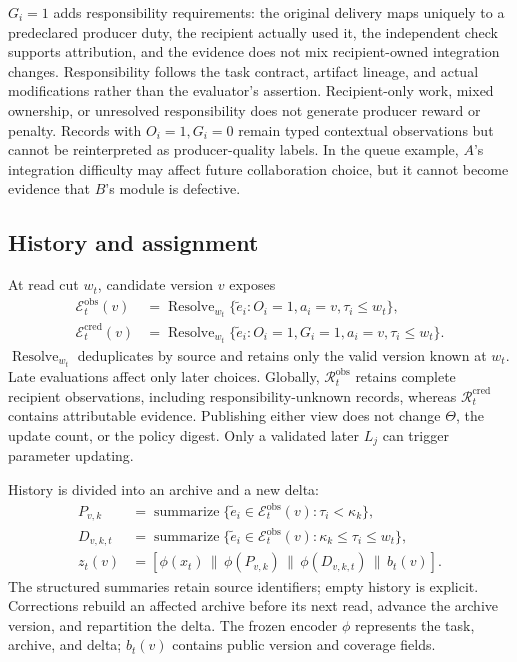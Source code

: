\documentclass[sigconf,anonymous]{aamas}
\begin{document}
$G_i=1$ adds responsibility requirements: the original delivery maps uniquely to a predeclared producer duty, the recipient actually used it, the independent check supports attribution, and the evidence does not mix recipient-owned integration changes. Responsibility follows the task contract, artifact lineage, and actual modifications rather than the evaluator's assertion. Recipient-only work, mixed ownership, or unresolved responsibility does not generate producer reward or penalty. Records with $O_i=1,G_i=0$ remain typed contextual observations but cannot be reinterpreted as producer-quality labels. In the queue example, $A$'s integration difficulty may affect future collaboration choice, but it cannot become evidence that $B$'s module is defective.

\subsection{History and assignment}
At read cut $w_t$, candidate version $v$ exposes
\begin{align}
\mathcal E_t^{\mathrm{obs}}(v)&=\operatorname{Resolve}_{w_t}
 \{\tilde e_i:O_i=1,a_i=v,\tau_i\leq w_t\},\\
\mathcal E_t^{\mathrm{cred}}(v)&=\operatorname{Resolve}_{w_t}
 \{\tilde e_i:O_i=1,G_i=1,a_i=v,\tau_i\leq w_t\}.
\label{eq:views}
\end{align}
$\operatorname{Resolve}_{w_t}$ deduplicates by source and retains only the valid version known at $w_t$. Late evaluations affect only later choices. Globally, $\mathcal R_t^{\mathrm{obs}}$ retains complete recipient observations, including responsibility-unknown records, whereas $\mathcal R_t^{\mathrm{cred}}$ contains attributable evidence. Publishing either view does not change $\Theta$, the update count, or the policy digest. Only a validated later $L_j$ can trigger parameter updating.

History is divided into an archive and a new delta:
\begin{align}
 P_{v,k}&=\operatorname{summarize}\{\tilde e_i\in\mathcal E_t^{\mathrm{obs}}(v):\tau_i<\kappa_k\},\\
 D_{v,k,t}&=\operatorname{summarize}\{\tilde e_i\in\mathcal E_t^{\mathrm{obs}}(v):\kappa_k\leq\tau_i\leq w_t\},\\
 z_t(v)&=[\phi(x_t)\,\|\,\phi(P_{v,k})\,\|\,\phi(D_{v,k,t})\,\|\,b_t(v)].
\label{eq:representation}
\end{align}
The structured summaries retain source identifiers; empty history is explicit. Corrections rebuild an affected archive before its next read, advance the archive version, and repartition the delta. The frozen encoder $\phi$ represents the task, archive, and delta; $b_t(v)$ contains public version and coverage fields.
\end{document}
